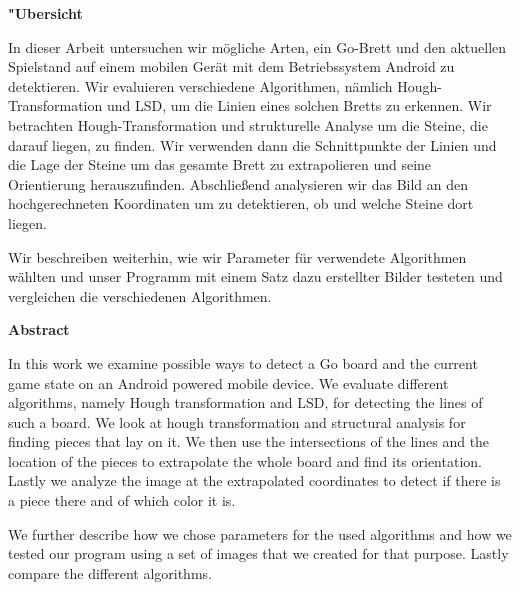 \documentclass[english,bt]{package/lmedoc}
\begin{document}
\cleardoublepage

\begin{center}
\bfseries
"Ubersicht
\normalfont

In dieser Arbeit untersuchen wir mögliche Arten, ein Go-Brett und den aktuellen Spielstand auf einem mobilen Gerät mit dem Betriebssystem Android zu detektieren. Wir evaluieren verschiedene Algorithmen, nämlich Hough-Transformation und LSD, um die Linien eines solchen Bretts zu erkennen. Wir betrachten Hough-Transformation und strukturelle Analyse um die Steine, die darauf liegen, zu finden. Wir verwenden dann die Schnittpunkte der Linien und die Lage der Steine um das gesamte Brett zu extrapolieren und seine Orientierung herauszufinden. Abschließend analysieren wir das Bild an den hochgerechneten Koordinaten um zu detektieren, ob und welche Steine dort liegen.

Wir beschreiben weiterhin, wie wir Parameter für verwendete Algorithmen wählten und unser Programm mit einem Satz dazu erstellter Bilder testeten und vergleichen die verschiedenen Algorithmen.
\end{center}


\vspace{5.0cm}

\begin{center}
\bfseries
Abstract
\normalfont

In this work we examine possible ways to detect a Go board and the current game state on an Android powered mobile device. We evaluate different algorithms, namely Hough transformation and LSD, for detecting the lines of such a board.  We look at hough transformation and structural analysis for finding pieces that lay on it. We then use the intersections of the lines and the location of the pieces to extrapolate the whole board and find its orientation. Lastly we analyze the image at the extrapolated coordinates to detect if there is a piece there and of which color it is.

We further describe how we chose parameters for the used algorithms and how we tested our program using a set of images that we created for that purpose. Lastly compare the different algorithms.
\end{center}

\cleardoublepage

\tableofcontents

\cleardoublepage {}


\cleardoublepage

\cleardoublepage

\cleardoublepage

\cleardoublepage

\cleardoublepage
\end{document}
